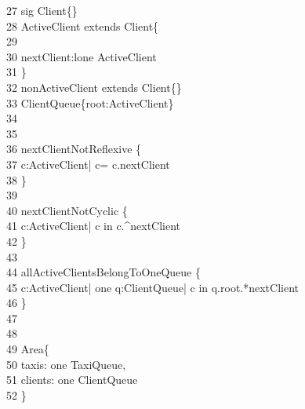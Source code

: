 \-    \ 27	 {\color{blue}sig} Client\{\}\\
\-    \ 28	 ActiveClient {\color{blue}extends} Client\{\\
\-    \ 29	\qquad \-\\
\-    \ 30	\qquad \-\qquad nextClient:lone ActiveClient\\
\-    \ 31	\qquad \}\\
\-    \ 32	 nonActiveClient {\color{blue}extends} Client\{\}\\
\-    \ 33	 ClientQueue\{root:ActiveClient\}\\
\-    \ 34	\qquad \\
\-    \ 35	\\
\-    \ 36	 nextClientNotReflexive \{ \\
\-    \ 37	\qquad \- c:ActiveClient| c= c.nextClient\\
\-    \ 38	\qquad \}\\
\-    \ 39	\\
\-    \ 40	 nextClientNotCyclic \{\\
\-    \ 41	\qquad \- c:ActiveClient| c {\color{blue}in} c.\string^nextClient\\
\-    \ 42	\qquad \} \\
\-    \ 43	\\
\-    \ 44	 allActiveClientsBelongToOneQueue \{\\
\-    \ 45	\qquad \- c:ActiveClient| {\color{blue}one} q:ClientQueue| c {\color{blue}in} q.root.*nextClient\\
\-    \ 46	\qquad \}\\
\-    \ 47	\qquad \\
\-    \ 48	\\
\-    \ 49	 Area\{\\
\-    \ 50	\qquad \-\qquad taxis: {\color{blue}one} TaxiQueue, \\
\-    \ 51	\qquad \-\qquad clients: {\color{blue}one} ClientQueue\\
\-    \ 52	\qquad \}\\
